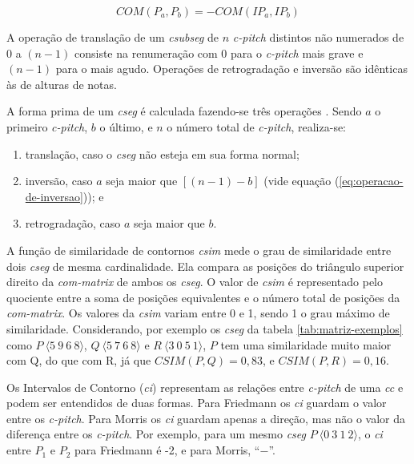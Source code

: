 \documentclass{article}
\newcommand{\termo}[1]{\textit{#1}}
\begin{document}
\begin{equation}
  \label{eq:operacao-de-inversao-na-comparacao}
  COM(P_a,P_b)=-COM(IP_a,IP_b)
\end{equation}

A operação de translação de um \termo{csubseg} de $n$ \termo{c-pitch}
distintos não numerados de $0$ a $(n-1)$ consiste na renumeração com
$0$ para o \termo{c-pitch} mais grave e $(n-1)$ para o mais
agudo. Operações de retrogradação e inversão são idênticas às de
alturas de notas.

A forma prima de um \termo{cseg} é calculada fazendo-se três operações
\cite{marvin.ea87:relating}. Sendo $a$ o primeiro \termo{c-pitch}, $b$
o último, e $n$ o número total de \termo{c-pitch}, realiza-se:
\begin{enumerate}
\item translação, caso o \termo{cseg} não esteja em sua forma normal;
\item inversão, caso $a$ seja maior que $[(n-1) - b]$ (vide equação
  (\ref{eq:operacao-de-inversao})); e
\item retrogradação, caso $a$ seja maior que $b$.
\end{enumerate}

A função de similaridade de contornos \termo{csim} mede o grau de
similaridade entre dois \termo{cseg} de mesma cardinalidade. Ela
compara as posições do triângulo superior direito da
\termo{com-matrix} de ambos os \termo{cseg}. O valor de \termo{csim} é
representado pelo quociente entre a soma de posições equivalentes e o
número total de posições da \termo{com-matrix}. Os valores da
\termo{csim} variam entre 0 e 1, sendo 1 o grau máximo de
similaridade. Considerando, por exemplo os \termo{cseg} da tabela
\ref{tab:matriz-exemplos} como $P\:\langle5\:9\:6\:8\rangle$,
$Q\:\langle5\:7\:6\:8\rangle$ e $R\:\langle3\:0\:5\:1\rangle$, $P$ tem
uma similaridade muito maior com Q, do que com R, já que
$CSIM(P,Q)=0,83$, e $CSIM(P,R)=0,16$.

Os Intervalos de Contorno (\termo{ci}) representam as relações entre
\termo{c-pitch} de uma \termo{cc} e podem ser entendidos de duas
formas. Para Friedmann \cite{friedmann85:methodology} os \termo{ci}
guardam o valor entre os \termo{c-pitch}. Para Morris
\cite{morris93:directions} os \termo{ci} guardam apenas a direção, mas
não o valor da diferença entre os \termo{c-pitch}. Por exemplo, para
um mesmo \termo{cseg} $P\:\langle0\:3\:1\:2\rangle$, o \termo{ci}
entre $P_1$ e $P_2$ para Friedmann é -2, e para Morris, ``$-$''.
\end{document}
